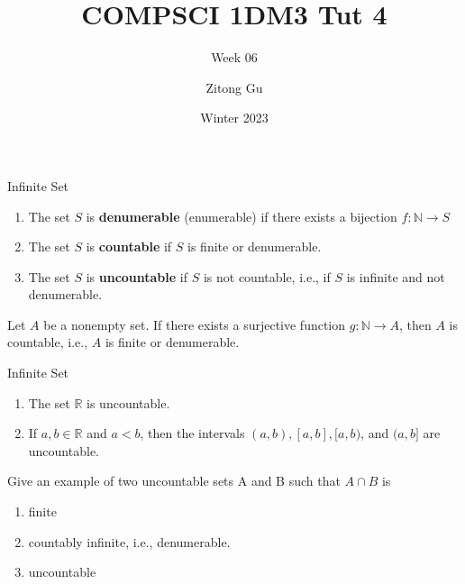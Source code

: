 \documentclass{beamer}
\title{COMPSCI 1DM3 Tut 4}
\subtitle{Week 06}
\author{Zitong Gu}
\institute{McMaster University}
\date{Winter 2023}
\begin{document}
\frame{\titlepage}

\begin{frame}{Infinite Set}
    \begin{definition}
        \begin{enumerate}
            \item The set $S$ is \textbf{denumerable} (enumerable) if there exists a bijection $f: \mathbb{N} \to S$
            \item The set $S$ is \textbf{countable} if $S$ is finite or denumerable. 
            \item The set $S$ is \textbf{uncountable} if $S$ is not countable, i.e., if $S$ is infinite and not denumerable. 
        \end{enumerate}
    \end{definition}
    \begin{theorem}
        Let $A$ be a nonempty set. If there exists a surjective function $g: \mathbb{N} \to A$, then $A$ is countable, i.e., $A$ is finite or denumerable.
    \end{theorem}
\end{frame}

\begin{frame}[t]{Infinite Set}
    \begin{theorem}
        \begin{enumerate}
            \item The set $\mathbb{R}$ is uncountable.
            \item If $a,b \in \mathbb{R}$ and  $a<b$, then the intervals $(a,b), [a,b], [a,b)$, and  $(a,b]$ are uncountable.
        \end{enumerate}
    \end{theorem}
    \begin{example}
        Give an example of two uncountable sets A and B such that $A \cap B$ is \begin{enumerate}
            \item finite

            \vspace{6mm}
            
            \item countably infinite, i.e., denumerable. 
            
            \vspace{6mm}
            
            \item uncountable
            
            \vspace{8mm}
            
        \end{enumerate} 
    \end{example}
\end{frame}
\end{document}
